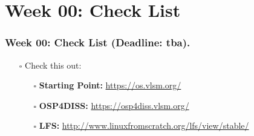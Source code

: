


\section{Week 00: Check List}
\begin{frame}
\frametitle{Week 00: Check List (Deadline: tba).}
\begin{itemize}
\item [$\square$] Check this out: 
\begin{itemize}
\item [$\square$] \textbf{Starting Point:} \url{https://os.vlsm.org/}
\item [$\square$] \textbf{OSP4DISS:} \url{https://osp4diss.vlsm.org/}
\item [$\square$] \textbf{LFS:} \url{http://www.linuxfromscratch.org/lfs/view/stable/}
\end{itemize}
\end{itemize}
\end{frame}

